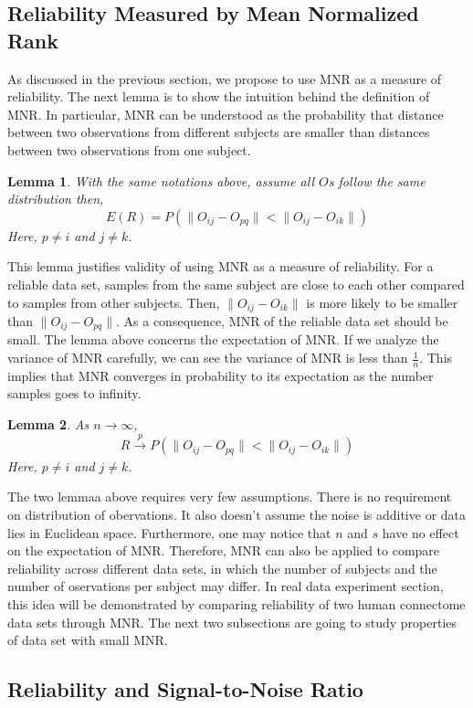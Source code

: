 \documentclass[11pt,journal,compsoc]{IEEEtran}
\newtheorem{lemma}{Lemma}
\begin{document}
\subsection{Reliability Measured by Mean Normalized Rank}

As discussed in the previous section, we propose to use MNR as a measure of reliability. The next lemma is to show the intuition behind the definition of MNR. In particular, MNR can be understood as the probability that distance between two observations from different subjects are smaller than distances between two observations from one subject.
\begin{lemma} 
With the same notations above, assume all $O$s follow the same distribution then,
\[ E(R) = P(\|O_{ij}-O_{pq}\| < \|O_{ij}-O_{ik}\|)\]
Here, $p\neq i$ and $j\neq k$.
\end{lemma} 
\noindent This lemma justifies validity of using MNR as a measure of reliability. For a reliable data set, samples from the same subject are close to each other compared to samples from other subjects. Then, $\|O_{ij}-O_{ik}\|$ is more likely to be smaller than $\|O_{ij}-O_{pq}\|$. As a consequence, MNR of the reliable data set should be small. The lemma above concerns the expectation of MNR. If we analyze the variance of MNR carefully, we can see the variance of MNR is less than $\frac{1}{n}$. This implies that MNR converges in probability to its expectation as the number samples goes to infinity. 
\begin{lemma} 
As $n \rightarrow \infty$,
\[R \xrightarrow[]{p} P(\|O_{ij}-O_{pq}\| < \|O_{ij}-O_{ik}\|)\]
Here, $p\neq i$ and $j\neq k$.
\end{lemma} 
\noindent The two lemmaa above requires very few assumptions. There is no requirement on distribution of obervations. It also doesn't assume the noise is additive or data lies in Euclidean space. Furthermore, one may notice that $n$ and $s$ have no effect on the expectation of MNR. Therefore, MNR can also be applied to compare reliability across different data sets, in which the number of subjects and the number of oservations per subject may differ. In real data experiment section, this idea will be demonstrated by comparing reliability of two human connectome data sets through MNR. The next two subsections are going to study properties of data set with small MNR.

\subsection{Reliability and Signal-to-Noise Ratio}
\end{document}
